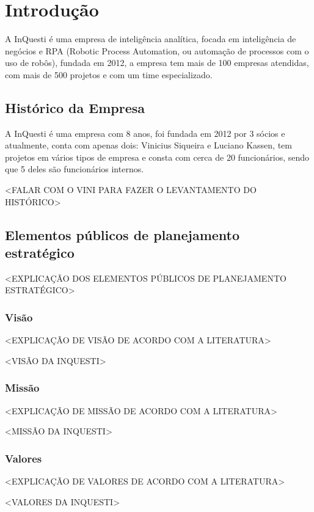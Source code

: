 
\chapter[Introdução]{Introdução}
A InQuesti é uma empresa de inteligência analítica, focada em inteligência de negócios e RPA (Robotic Process Automation, ou automação de processos com o uso de robôs), fundada em 2012, a empresa tem mais de 100 empresas atendidas, com mais de 500 projetos e com um time especializado. 

\section{Histórico da Empresa}
A InQuesti é uma empresa com 8 anos, foi fundada em 2012 por 3 sócios e atualmente, conta com apenas dois: Vinicius Siqueira e Luciano Kassen, tem projetos em vários tipos de empresa e consta com cerca de 20 funcionários, sendo que 5 deles são funcionários internos. 

<FALAR COM O VINI PARA FAZER O LEVANTAMENTO DO HISTÓRICO>

\section{Elementos públicos de planejamento estratégico}

<EXPLICAÇÃO DOS ELEMENTOS PÚBLICOS DE PLANEJAMENTO ESTRATÉGICO>

\subsection{Visão}
<EXPLICAÇÃO DE VISÃO DE ACORDO COM A LITERATURA>

<VISÃO DA INQUESTI>

\subsection{Missão}
<EXPLICAÇÃO DE MISSÃO DE ACORDO COM A LITERATURA>

<MISSÃO DA INQUESTI>

\subsection{Valores}
<EXPLICAÇÃO DE VALORES DE ACORDO COM A LITERATURA>

<VALORES DA INQUESTI>
